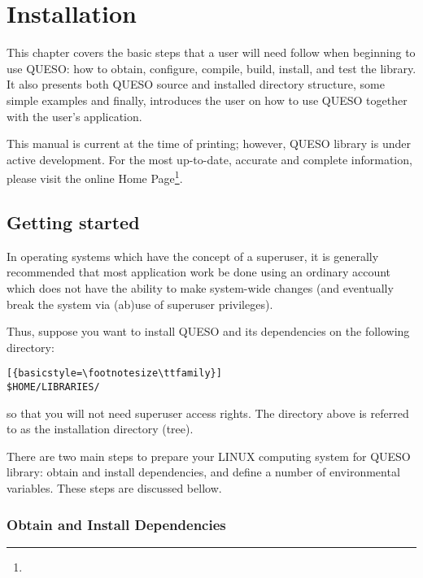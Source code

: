 \chapter{Installation}\label{ch-install}
\thispagestyle{headings}



This chapter covers the basic steps that a user will need follow when beginning to use QUESO:
how to obtain, configure, compile, build, install, and test the library.  It also presents both QUESO source and installed directory structure, some simple examples and finally,  introduces the user on how to use QUESO together with the user's  application.

This manual is current at the time of printing; however, QUESO library  is under active development.
For the most up-to-date, accurate and complete information, please visit the online \Queso{} Home Page\footnote{\Quesoweb}.

\section{Getting started}\label{sec:Pre_Queso}

In operating systems which have the concept of a superuser, it is generally recommended that most application work be done
using an ordinary account which does not have the ability to make system-wide changes (and eventually break the system via
(ab)use of superuser privileges).

Thus, suppose you want to install QUESO and its dependencies on the following directory:
\begin{lstlisting}[{basicstyle=\footnotesize\ttfamily}]
$HOME/LIBRARIES/
\end{lstlisting}
%
so that you will not need superuser access rights. The directory above is referred to as the \Queso{} installation directory (tree).

There are two main steps to prepare your LINUX computing system  for QUESO library: obtain and install \Queso{} dependencies, and define a number of environmental variables. These steps are discussed bellow.


\subsection{Obtain and Install \Queso{} Dependencies}


